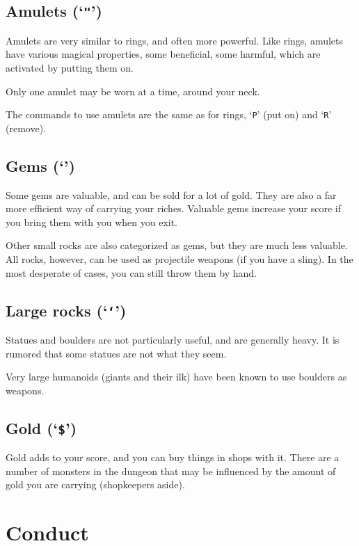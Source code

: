 \subsection*{Amulets (`{\tt "}')}


Amulets are very similar to rings, and often more powerful.  Like
rings, amulets have various magical properties, some beneficial,
some harmful, which are activated by putting them on.

Only one amulet may be worn at a time, around your neck.

The commands to use amulets are the same as for rings, `{\tt P}' (put on)
and `{\tt R}' (remove).
\subsection*{Gems (`{\tt *}')}


Some gems are valuable, and can be sold for a lot of gold.  They are also
a far more efficient way of carrying your riches.  Valuable gems increase
your score if you bring them with you when you exit.

Other small rocks are also categorized as gems, but they are much less
valuable.  All rocks, however, can be used as projectile weapons (if you
have a sling).  In the most desperate of cases, you can still throw them
by hand.
\subsection*{Large rocks (`{\tt `}')}


Statues and boulders are not particularly useful, and are generally
heavy.  It is rumored that some statues are not what they seem.

Very large humanoids (giants and their ilk) have been known to use boulders
as weapons.
\subsection*{Gold (`{\tt \$}')}


Gold adds to your score, and you can buy things in shops with it.
There are a number
of monsters in the dungeon that may be influenced by the amount of gold
you are carrying (shopkeepers aside).

\section{Conduct}

